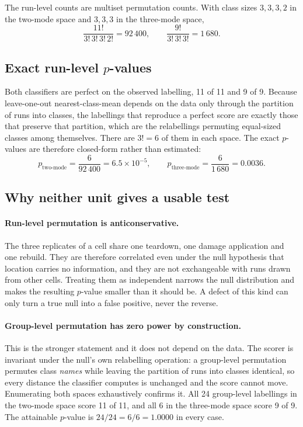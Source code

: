 The run-level counts are multiset permutation counts. With class sizes
$3,3,3,2$ in the two-mode space and $3,3,3$ in the three-mode space,
%
\begin{equation*}
  \frac{11!}{3!\,3!\,3!\,2!} = 92\,400,
  \qquad
  \frac{9!}{3!\,3!\,3!} = 1\,680 .
\end{equation*}

\subsection*{Exact run-level $p$-values}

Both classifiers are perfect on the observed labelling, 11 of 11 and 9 of 9.
Because leave-one-out nearest-class-mean depends on the data only through the
partition of runs into classes, the labellings that reproduce a perfect score are
exactly those that preserve that partition, which are the relabellings permuting
equal-sized classes among themselves. There are $3!=6$ of them in each space.
The exact $p$-values are therefore closed-form rather than estimated:
%
\begin{equation*}
  p_{\text{two-mode}} = \frac{6}{92\,400} = 6.5\times10^{-5},
  \qquad
  p_{\text{three-mode}} = \frac{6}{1\,680} = 0.0036 .
\end{equation*}

\subsection*{Why neither unit gives a usable test}

\paragraph{Run-level permutation is anticonservative.} The three replicates of a
cell share one teardown, one damage application and one rebuild. They are
therefore correlated even under the null hypothesis that location carries no
information, and they are not exchangeable with runs drawn from other cells.
Treating them as independent narrows the null distribution and makes the
resulting $p$-value smaller than it should be. A defect of this kind can only
turn a true null into a false positive, never the reverse.

\paragraph{Group-level permutation has zero power by construction.} This is the
stronger statement and it does not depend on the data. The scorer is invariant
under the null's own relabelling operation: a group-level permutation permutes
class \emph{names} while leaving the partition of runs into classes identical, so
every distance the classifier computes is unchanged and the score cannot move.
Enumerating both spaces exhaustively confirms it. All 24 group-level labellings
in the two-mode space score 11 of 11, and all 6 in the three-mode space score 9
of 9. The attainable $p$-value is $24/24 = 6/6 = 1.0000$ in every case.

